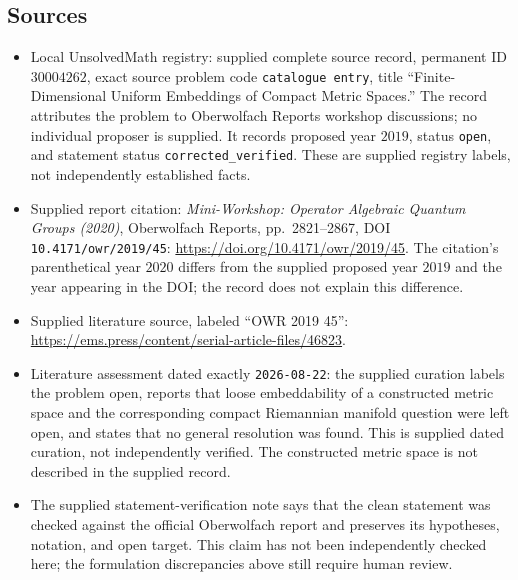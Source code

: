 \documentclass[11pt]{article}
\begin{document}
\subsection{Sources}
\begin{itemize}
\item Local UnsolvedMath registry: supplied complete source record, permanent ID \(30004262\), exact source problem code \texttt{catalogue entry}, title ``Finite-Dimensional Uniform Embeddings of Compact Metric Spaces.'' The record attributes the problem to Oberwolfach Reports workshop discussions; no individual proposer is supplied. It records proposed year \(2019\), status \texttt{open}, and statement status \texttt{corrected\_verified}. These are supplied registry labels, not independently established facts.
\item Supplied report citation: \emph{Mini-Workshop: Operator Algebraic Quantum Groups (2020)}, Oberwolfach Reports, pp.\ 2821--2867, DOI \texttt{10.4171/owr/2019/45}: \url{https://doi.org/10.4171/owr/2019/45}. The citation's parenthetical year \(2020\) differs from the supplied proposed year \(2019\) and the year appearing in the DOI; the record does not explain this difference.
\item Supplied literature source, labeled ``OWR 2019 45'': \url{https://ems.press/content/serial-article-files/46823}.
\item Literature assessment dated exactly \texttt{2026-08-22}: the supplied curation labels the problem open, reports that loose embeddability of a constructed metric space and the corresponding compact Riemannian manifold question were left open, and states that no general resolution was found. This is supplied dated curation, not independently verified. The constructed metric space is not described in the supplied record.
\item The supplied statement-verification note says that the clean statement was checked against the official Oberwolfach report and preserves its hypotheses, notation, and open target. This claim has not been independently checked here; the formulation discrepancies above still require human review.
\end{itemize}
\end{document}
